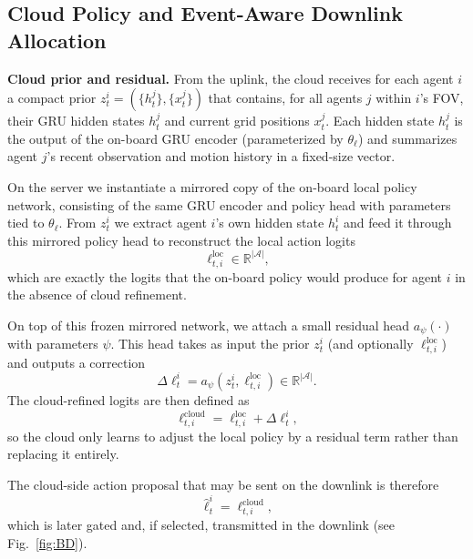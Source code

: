 \documentclass[conference]{IEEEtran}
\begin{document}



\subsection{Cloud Policy and Event-Aware Downlink Allocation}

\textbf{Cloud prior and residual.}
From the uplink, the cloud receives for each agent $i$ a compact prior
$z_t^i = (\{h_t^j\}, \{x_t^j\})$ that contains, for all agents $j$ within $i$’s FOV, their GRU hidden states $h_t^j$ and current grid positions $x_t^j$. Each hidden state $h_t^j$ is the output of the on-board GRU encoder (parameterized by $\theta_\ell$) and summarizes agent $j$’s recent observation and motion history in a fixed-size vector.

On the server we instantiate a mirrored copy of the on-board local policy network, consisting of the same GRU encoder and policy head with parameters tied to $\theta_\ell$. From $z_t^i$ we extract agent $i$’s own hidden state $h_t^i$ and feed it through this mirrored policy head to reconstruct the local action logits
\[
\ell_{t,i}^{\mathrm{loc}} \in \mathbb{R}^{|\mathcal{A}|},
\]
which are exactly the logits that the on-board policy would produce for agent $i$ in the absence of cloud refinement.

On top of this frozen mirrored network, we attach a small residual head $a_\psi(\cdot)$ with parameters $\psi$. This head takes as input the prior $z_t^i$ (and optionally $\ell_{t,i}^{\mathrm{loc}}$) and outputs a correction
\[
\Delta \ell_t^i = a_\psi(z_t^i, \ell_{t,i}^{\mathrm{loc}}) \in \mathbb{R}^{|\mathcal{A}|}.
\]
The cloud-refined logits are then defined as
\[
\ell_{t,i}^{\mathrm{cloud}} = \ell_{t,i}^{\mathrm{loc}} + \Delta \ell_t^i,
\]
so the cloud only learns to adjust the local policy by a residual term rather than replacing it entirely.

The cloud-side action proposal that may be sent on the downlink is therefore
\[
\hat\ell_t^i = \ell_{t,i}^{\mathrm{cloud}},
\]
which is later gated and, if selected, transmitted in the downlink 
(see Fig.~\ref{fig:BD}).
\end{document}
